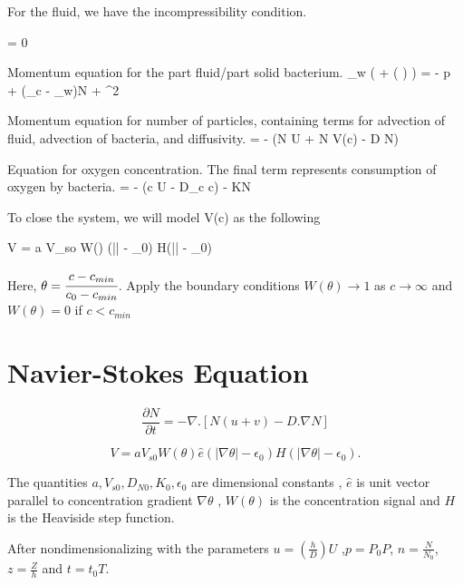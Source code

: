 \documentclass[]{article}
\numberwithin{equation}{section}		%
\let\[\equation
\let\]\endequation
\begin{document}
For the fluid, we have the incompressibility condition.

\[ 	\nabla \cdot {} = 0 \]

\[ 	  \]

Momentum equation for the part fluid/part solid bacterium.
\[
	\rho_w \left(  + ( \cdot \nabla )  \right) = - \nabla p + (\rho_c - \rho_w)\nu N  + \mu \nabla^2 
\]

Momentum equation for number of particles, containing terms for advection of fluid, advection of bacteria, and diffusivity.
\[
	 = - \nabla \cdot (N U + N V(c) - D \nabla N)
\]

Equation for oxygen concentration. The final term represents consumption of oxygen by bacteria.
\[
	 = - \nabla \cdot (c U  - D_c \nabla c) - KN
\]

To close the system, we will model V(c) as the following

\[
	V = a V_{so} W(\theta) (|\nabla \theta | - \epsilon_0) H(|\nabla \theta | - \epsilon_0)
\]

Here, $\theta = \cfrac{c - c_{min}}{c_0 - c_{min}}$. Apply the boundary conditions $W(\theta) \rightarrow 1$ as $c \rightarrow \infty$
and $W(\theta) = 0$ if $c < c_{min}$


\section*{Navier-Stokes Equation}

\begin{equation}
\frac{\partial N}{\partial t} = -\nabla.[N(u+v)-D.\nabla N] \nonumber
\end{equation}

\begin{equation}
V = a V_{s0} W(\theta) \hat{e}(\left| \nabla \theta \right| - \epsilon_0)H(\left| \nabla \theta \right| - \epsilon_0). \nonumber
\end{equation}

The quantities $a,V_{s0},D_{N0},K_0,\epsilon_0$ are dimensional constants , $\hat{e}$ is unit vector parallel to concentration gradient $\nabla \theta$ , $W(\theta)$ is the concentration signal and $H$ is the Heaviside step function.

After nondimensionalizing with the parameters $u=(\frac{h}{D})U$ ,$p=P_0 P$, $n=\frac{N}{N_0}$, $z=\frac{Z}{h}$ and $t=t_0 T$.
\end{document}
